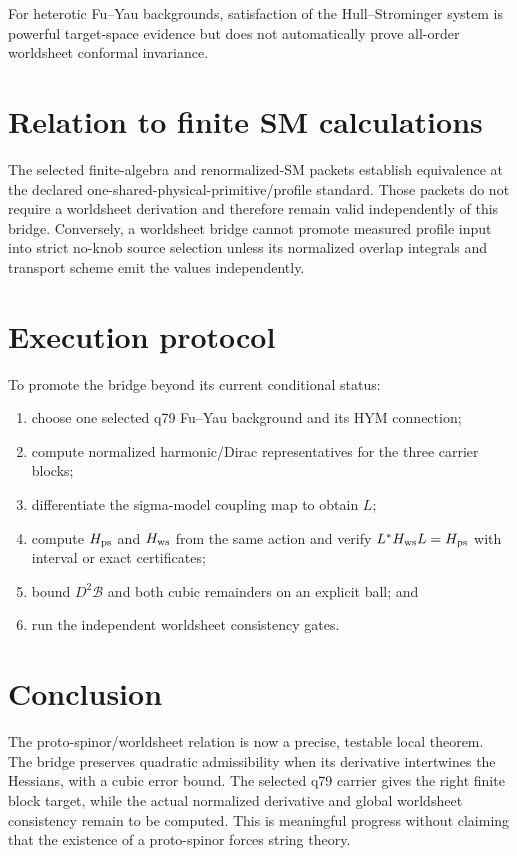 \documentclass[11pt]{article}
\begin{document}
For heterotic Fu--Yau backgrounds, satisfaction of the Hull--Strominger system
is powerful target-space evidence but does not automatically prove all-order
worldsheet conformal invariance.

\section{Relation to finite SM calculations}

The selected finite-algebra and renormalized-SM packets establish equivalence
at the declared one-shared-physical-primitive/profile standard.  Those packets
do not require a worldsheet derivation and therefore remain valid independently
of this bridge.  Conversely, a worldsheet bridge cannot promote measured
profile input into strict no-knob source selection unless its normalized
overlap integrals and transport scheme emit the values independently.

\section{Execution protocol}

To promote the bridge beyond its current conditional status:
\begin{enumerate}
\item choose one selected q79 Fu--Yau background and its HYM connection;
\item compute normalized harmonic/Dirac representatives for the three carrier
blocks;
\item differentiate the sigma-model coupling map to obtain $L$;
\item compute $H_{\rm ps}$ and $H_{\rm ws}$ from the same action and verify
$L^*H_{\rm ws}L=H_{\rm ps}$ with interval or exact certificates;
\item bound $D^2\mathcal B$ and both cubic remainders on an explicit ball; and
\item run the independent worldsheet consistency gates.
\end{enumerate}

\section{Conclusion}

The proto-spinor/worldsheet relation is now a precise, testable local theorem.
The bridge preserves quadratic admissibility when its derivative intertwines
the Hessians, with a cubic error bound.  The selected q79 carrier gives the
right finite block target, while the actual normalized derivative and global
worldsheet consistency remain to be computed.  This is meaningful progress
without claiming that the existence of a proto-spinor forces string theory.
\end{document}
